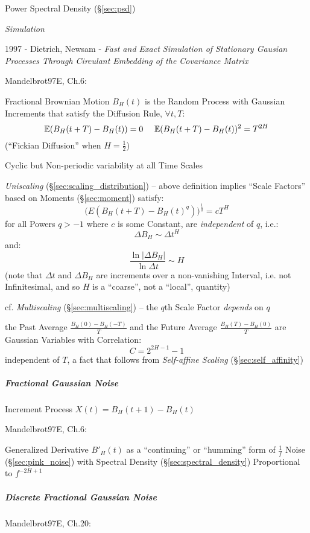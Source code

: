 Power Spectral Density (\S\ref{sec:psd})

\emph{Simulation}

1997 - Dietrich, Newsam - \emph{Fast and Exact Simulation of Stationary Gausian
  Processes Through Circulant Embedding of the Covariance Matrix}

Mandelbrot97E, Ch.6:

Fractional Brownian Motion $B_H(t)$ is the Random Process with Gaussian
Increments that satisfy the Diffusion Rule, $\forall t, T$:
\[
  \expect(B_H(t+T) - B_H(t)) = 0 \ \ \ \ \expect(B_H(t+T) - B_H(t))^2 = T^{2H}
\]
(``Fickian Diffusion'' when $H = \frac{1}{2}$)

Cyclic but Non-periodic variability at all Time Scales

\emph{Uniscaling} (\S\ref{sec:scaling_distribution}) -- above definition implies
``Scale Factors'' based on Moments (\S\ref{sec:moment}) satisfy:
\[
  \Big(E(B_H(t + T) - B_H(t)^q)\Big)^{\frac{1}{q}} = c T^H
\]
for all Powers $q > -1$ where $c$ is some Constant, are \emph{independent} of
$q$, i.e.:
\[
  \Delta B_H \sim \Delta t^H
\]
and:
\[
  \frac{\ln|\Delta B_H|}{\ln \Delta{t}} \sim H
\]
(note that $\Delta t$ and $\Delta B_H$ are increments over a non-vanishing
Interval, i.e. not Infinitesimal, and so $H$ is a ``coarse'', not a ``local'',
quantity)

cf. \emph{Multiscaling} (\S\ref{sec:multiscaling}) -- the $q$th Scale Factor
\emph{depends} on $q$

the Past Average $\frac{B_H(0) - B_H(-T)}{T}$ and the Future Average
$\frac{B_H(T) - B_H(0)}{T}$ are Gaussian Variables with Correlation:
\[
  C = 2^{2H-1} - 1
\]
independent of $T$, a fact that follows from \emph{Self-affine Scaling}
(\S\ref{sec:self_affinity})



\subparagraph{Fractional Gaussian Noise}\label{sec:fractional_gaussian}\hfill

Increment Process $X(t) = B_H(t+1) - B_H(t)$

Mandelbrot97E, Ch.6:

Generalized Derivative $B'_H(t)$ as a ``continuing'' or ``humming'' form of
$\frac{1}{f}$ Noise (\S\ref{sec:pink_noise}) with Spectral Density
(\S\ref{sec:spectral_density}) Proportional to $f^{-2H+1}$



\subparagraph{Discrete Fractional Gaussian Noise}\label{sec:dfgn}\hfill

Mandelbrot97E, Ch.20:

